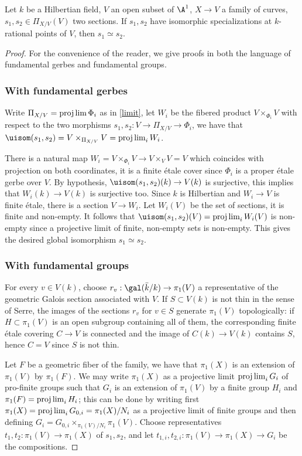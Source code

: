\begin{lemma}
\notready\label{hilbsp}
	Let $k$ be a Hilbertian field, $V$ an open subset of $\A^{1}$, $X\to V$ a family of curves, $s_{1},s_{2}\in\Pi_{X/V}(V)$ two sections. If $s_{1},s_{2}$ have isomorphic specializations at $k$-rational points of $V$, then $s_{1}\simeq s_{2}$.
	\begin{proof}
		For the convenience of the reader, we give proofs in both the language of fundamental gerbes and fundamental groups.

		\subsubsection*{With fundamental gerbes} Write $\Pi_{X/V}=\projlim\Phi_{i}$ as in \autoref{limit}, let $W_{i}$ be the fibered product $V\times_{\Phi_{i}}V$ with respect to the two morphisms $s_{1},s_{2}:V\to\Pi_{X/V}\to\Phi_{i}$, we have that $\uisom(s_{1},s_{2})=V\times_{\Pi_{X/V}}V=\projlim_{i}W_{i}$.

		There is a natural map $W_{i}=V\times_{\Phi_{i}}V\to V\times_{V}V=V$ which coincides with projection on both coordinates, it is a finite étale cover since $\Phi_{i}$ is a proper étale gerbe over $V$. By hypothesis, $\uisom(s_{1},s_{2})(k)\to V(k)$ is surjective, this implies that $W_{i}(k)\to V(k)$ is surjective too. Since $k$ is Hilbertian and $W_{i}\to V$ is finite étale, there is a section $V\to W_{i}$. Let $W_{i}(V)$ be the set of sections, it is finite and non-empty. It follows that $\uisom(s_{1},s_{2})(V)=\projlim_{i}W_{i}(V)$ is non-empty since a projective limit of finite, non-empty sets is non-empty. This gives the desired global isomorphism $s_{1}\simeq s_{2}$.

		\subsubsection*{With fundamental groups} For every $v\in V(k)$, choose $r_{v}:\gal(\bar{k}/k)\to\pi_{1}(V)$ a representative of the geometric Galois section associated with $V$. If $S\subset V(k)$ is not thin in the sense of Serre, the images of the sections $r_{v}$ for $v\in S$ generate $\pi_{1}(V)$ topologically: if $H\subset\pi_{1}(V)$ is an open subgroup containing all of them, the corresponding finite étale covering $C\to V$ is connected and the image of $C(k)\to V(k)$ contains $S$, hence $C=V$ since $S$ is not thin.

		Let $F$ be a geometric fiber of the family, we have that $\pi_{1}(X)$ is an extension of $\pi_{1}(V)$ by $\pi_{1}(F)$. We may write $\pi_{1}(X)$ as a projective limit $\projlim_{i}G_{i}$ of pro-finite groups such that $G_{i}$ is an extension of $\pi_{1}(V)$ by a finite group $H_{i}$ and $\pi_{1}(F)=\projlim_{i}H_{i}$; this can be done by writing first $\pi_{1}(X)=\projlim_{i}G_{0,i}=\pi_{1}(X)/N_{i}$ as a projective limit of finite groups and then defining $G_{i}=G_{0,i}\times_{\pi_{1}(V)/N_{i}}\pi_{1}(V)$. Choose representatives $t_{1},t_{2}:\pi_{1}(V)\to\pi_{1}(X)$ of $s_{1},s_{2}$, and let $t_{1,i},t_{2,i}:\pi_{1}(V)\to \pi_{1}(X)\to G_{i}$ be the compositions.


\end{proof}
\end{lemma}
